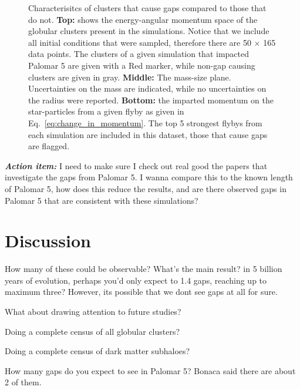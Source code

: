 \documentclass[draft]{aa}
\begin{document}
\begin{figure}
      \caption{Characterisitcs of clusters that cause gaps compared to those that do not. \textbf{Top:} shows the energy-angular momentum space of the globular clusters present in the simulations. Notice that we include all initial conditions that were sampled, therefore there are 50 $\times$ 165 data points. The clusters of a given simulation that impacted Palomar 5 are given with a Red marker, while non-gap causing clusters are given in gray. \textbf{Middle:} The mass-size plane. Uncertainties on the mass are indicated, while no uncertainties on the radius were reported. \textbf{Bottom:} the imparted momentum on the star-particles from a given flyby as given in Eq.~\ref{eq:change_in_momentum}. The top 5 strongest flybys from each simulation are included in this dataset, those that cause gaps are flagged.}
      \label{fig:mass_size_plane}
      \end{figure}


  
  



    \textbf{\textit{Action item:}} I need to make sure I check out real good the papers that investigate the gaps from Palomar 5. I wanna compare this to the known length of Palomar 5, how does this reduce the results, and are there observed gaps in Palomar 5 that are consistent with these simulations? 



  \section{Discussion}
    How many of these could be observable? What's the main result? in 5 billion years of evolution, perhaps you'd only expect to 1.4 gaps, reaching up to maximum three? However, its possible that we dont see gaps at all for sure. 

    What about drawing attention to future studies? 

    Doing a complete census of all globular clusters? 

    Doing a complete census of dark matter subhaloes? 

    How many gaps do you expect to see in Palomar 5? Bonaca said there are about 2 of them. 





\end{document}
